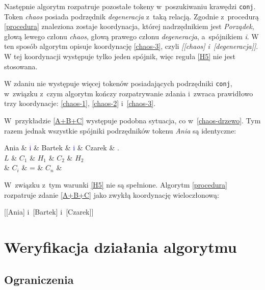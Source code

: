 Następnie algorytm rozpatruje pozostałe tokeny w~poszukiwaniu krawędzi \texttt{conj}. Token \textit{chaos} posiada podrzędnik \textit{degeneracja} z~taką relacją. Zgodnie z~procedurą \eqref{procedura} znaleziona zostaje koordynacja, której nadrzędnikiem jest \textit{Porządek}, głową lewego członu \textit{chaos}, głową prawego członu \textit{degeneracja}, a~spójnikiem \textit{i}. W ten sposób algorytm opisuje koordynację \eqref{chaos-3}, czyli \textit{[[chaos] i~[degeneracja]]}. W tej koordynacji występuje tylko jeden spójnik, więc reguła \ref{H5} nie jest stosowana.

W zdaniu nie występuje więcej tokenów posiadających podrzędniki \texttt{conj}, w~związku z~czym algorytm kończy rozpatrywanie zdania i~zwraca prawidłowo trzy koordynacje: \eqref{chaos-1}, \eqref{chaos-2} i~\eqref{chaos-3}.

W~przykładzie \eqref{A+B+C} występuje podobna sytuacja, co w~\eqref{chaos-drzewo}. Tym razem jednak wszystkie spójniki podrzędników tokenu \emph{Ania} są identyczne:

\begin{exe}
\ex \label{A+B+C}
\begin{dependency}[baseline=2.9ex]
\begin{deptext}[column sep=1em, row sep=.3ex]
Ania \& \textcolor{blue}{i} \& Bartek \& \textcolor{blue}{i} \& Czarek \& .  \\ 
$L$ \& $C_{1}$ \& $H_{1}$ \& $C_{2}$ \& $H_{2}$ \\
 \& $C_{i}$ \& = \& $C_{n}$ \& \\
\end{deptext}
\end{dependency}
\end{exe}

W~związku z~tym warunki \ref{H5} nie są spełnione. Algorytm \eqref{procedura} rozpatruje zdanie \eqref{A+B+C} jako zwykłą koordynację wieloczłonową:

\begin{exe}
\ex \label{A+B+C-koordynacja}
{[[Ania] i~[Bartek] i~[Czarek]]}
\end{exe}

\section{Weryfikacja działania algorytmu}

\subsection{Ograniczenia}

